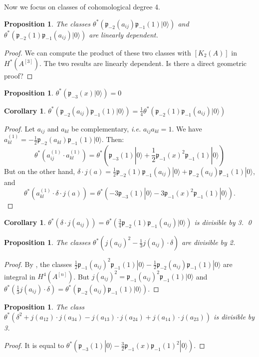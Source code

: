 \documentclass{amsart}
\newcommand{\hilb}[1]{^{[#1]}}
\newcommand{\ie}{{\it i.e. }}
\newcommand{\vac}{|0\rangle}
\newcommand{\p}{\mathfrak{p}}
\newcommand{\pone}{ \mathfrak{p}_{ - 1} }
\newcommand{\kum}[2]{K_{ #2 }( #1 )}
\theoremstyle{plain}
\newtheorem{proposition}[theorem]{Proposition}
\newtheorem{corollary}[theorem]{Corollary}
\theoremstyle{definition}
\theoremstyle{remark}
\begin{document}
Now we focus on classes of cohomological degree 4.
\begin{proposition}
The classes $\theta^* \left(\p_{-2}(a_{ij})\pone(1)\vac\right) $ and $\theta^*\left( \p_{-2}(1)\pone(a_{ij})\vac\right) $ are linearly dependent.
\end{proposition}
\begin{proof}
We can compute the product of these two classes with $[ \kum{A}{2} ] $ in $H^*(A\hilb{3})$. The two results are linearly dependent. Is there a direct geometric proof?
\end{proof}

\begin{proposition}
$\theta^*\left(\p_{-3}(x)\vac\right) =0$ 
\end{proposition}
\begin{corollary}
$\theta^* \left(\p_{-2}(a_{ij})\pone(1)\vac\right) = \frac{1}{4}\theta^*\left( \p_{-2}(1)\pone(a_{ij})\vac\right) $
\end{corollary}
\begin{proof}
Let  $a_{ij}$ and $a_{kl}$ be complementary, \ie $a_{ij}a_{kl}=1$. We have $a_{kl}^{(1)} = -\frac{1}{2} \p_{-2}(a_{kl})\pone(1)\vac$. Then:
$$
\theta^*\left(a_{ij}^{(1)}\cdot a_{kl}^{(1)} \right) =
\theta^*\left(\p_{-3}(1)\vac + \frac{1}{2}\pone(x)^2\pone(1)\vac \right)
$$
But on the other hand, $\delta \cdot j(a) = \frac{1}{2} \p_{-2}(1)\pone(a_{ij})\vac+\p_{-2}(a_{ij})\pone(1)\vac$, and
$$
\theta^*\left(a_{kl}^{(1)} \cdot \delta \cdot j(a)\right) =
\theta^*\left(-3\p_{-3}(1)\vac  - 3\pone(x)^2\pone(1)\vac \right).
$$
\end{proof}
\begin{corollary}
$\theta^*\left( \delta \cdot j(a_{ij}) \right) = \theta^*\left( \frac{3}{4} \p_{-2}(1)\pone(a_{ij})\vac\right)$ is divisible by 3. \qed
\end{corollary}
\begin{proposition}
The classes $\theta^*\left(j(a_{ij})^2 - \frac{1}{3}j(a_{ij})\cdot \delta\right)$ are divisible by 2.
\end{proposition}
\begin{proof}
By \cite{QinWang}, the classes $\frac{1}{2} \pone(a_{ij})^2\pone(1)\vac - \frac{1}{2}\p_{-2}(a_{ij})\pone(1)\vac$ are integral in $H^4(A\hilb{n})$. But $j(a_{ij})^2= \pone(a_{ij})^2\pone(1)\vac $ and $\theta^*\left(\frac{1}{3}j(a_{ij})\cdot\delta\right) =\theta^*\left(\p_{-2}(a_{ij})\pone(1)\vac\right)$.
\end{proof}


\begin{proposition}\label{DelSum3}
The class $\theta^*\left(\delta^2+j(a_{12})\cdot j(a_{34})-j(a_{13})\cdot j(a_{24})+j(a_{14})\cdot j(a_{23})\right)$ is divisible by 3.
\end{proposition}
\begin{proof}
It is equal to $\theta^*\left(\p_{-3}(1)\vac -\frac{3}{2}\pone(x)\pone(1)^2\vac \right)$.
\end{proof}
\end{document}
